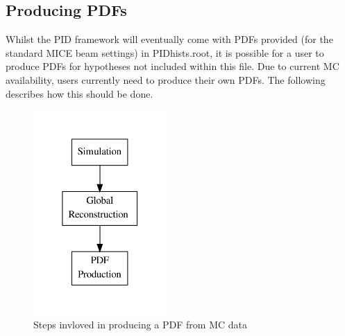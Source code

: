\subsection{Producing PDFs}
\label{PDFs}
Whilst the PID framework will eventually come with PDFs provided (for the standard MICE beam settings) in  PIDhists.root, it is possible for a user to produce PDFs for hypotheses not included within this file. Due to current MC availability, users currently need to produce their own PDFs. The following describes how this should be done.
\begin{figure}[h!]
\begin{center} 
\includegraphics[width=2in]{reconstruction/globalpid/pdfprodflow.pdf} 
\caption{Steps invloved in producing a PDF from MC data}
\label{pdfprod}
\end{center} 
\end{figure}
